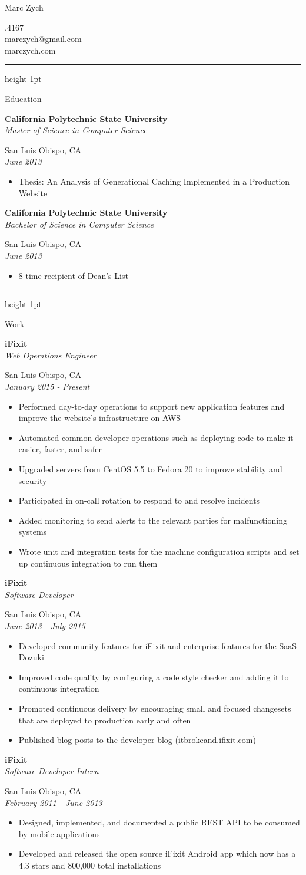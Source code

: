 \documentclass[letterpaper,10pt]{article}
\newcommand{\resauthor}[4]{
   \begin{minipage}[c]{.4\textwidth}
      \raggedright
      {\Huge #1}
   \end{minipage}
   \hfill
   \begin{minipage}[c]{.4\textwidth}
      \raggedleft
      #2\\
      #3\\
      #4
   \end{minipage}
}
\newcommand{\ressectiondivider}{
   \textcolor{black}{\hrule height 1pt}
}
\newcommand{\resitem}[1]{\item #1 \vspace{-2pt}}
\newcommand{\ressubheading}[4]{
   \begin{minipage}[t]{10cm}
      \flushleft
      \textbf{#1}\\
      \textit{#3}\\
   \end{minipage}
   \hfill
   \begin{minipage}[t]{5cm}
      \flushright
      #2\\
      \textit{#4}\\
   \end{minipage}
}
\newenvironment{ressection}[1]{
   \vspace{12pt}
   \ressectiondivider
   \vspace{5pt}
   \begin{minipage}[t]{2.5cm}
      \flushleft
      {\Large #1}
   \end{minipage}
   \hfill
   \begin{minipage}[t]{16cm}
      \flushleft
}{
   \end{minipage}
}
\begin{document}
\resauthor{Marc Zych}{805.217.4167}{marczych@gmail.com}{marczych.com}

\begin{ressection}{Education}
   \ressubheading{California Polytechnic State University}{San Luis Obispo, CA}{Master of Science in Computer Science}{June 2013}
   \begin{itemize}
      \resitem{Thesis: An Analysis of Generational Caching Implemented in a Production Website}
   \end{itemize}
   \ressubheading{California Polytechnic State University}{San Luis Obispo, CA}{Bachelor of Science in Computer Science}{June 2013}
   \begin{itemize}
      \resitem{8 time recipient of Dean's List}
   \end{itemize}
\end{ressection}

\begin{ressection}{Work}
   \ressubheading{iFixit}{San Luis Obispo, CA}{Web Operations Engineer}{January 2015 - Present}
   \begin{itemize}
      \resitem{Performed day-to-day operations to support new application features and improve the website's infrastructure on AWS}
      \resitem{Automated common developer operations such as deploying code to make it easier, faster, and safer}
      \resitem{Upgraded servers from CentOS 5.5 to Fedora 20 to improve stability and security}
      \resitem{Participated in on-call rotation to respond to and resolve incidents}
      \resitem{Added monitoring to send alerts to the relevant parties for malfunctioning systems}
      \resitem{Wrote unit and integration tests for the machine configuration scripts and set up continuous integration to run them}
   \end{itemize}
   \ressubheading{iFixit}{San Luis Obispo, CA}{Software Developer}{June 2013 - July 2015}
   \begin{itemize}
      \resitem{Developed community features for iFixit and enterprise features for the SaaS Dozuki}
      \resitem{Improved code quality by configuring a code style checker and adding it to continuous integration}
      \resitem{Promoted continuous delivery by encouraging small and focused changesets that are deployed to production early and often}
      \resitem{Published blog posts to the developer blog (itbrokeand.ifixit.com)}
   \end{itemize}
   \ressubheading{iFixit}{San Luis Obispo, CA}{Software Developer Intern}{February 2011 - June 2013}
   \begin{itemize}
      \resitem{Designed, implemented, and documented a public REST API to be consumed by mobile applications}
      \resitem{Developed and released the open source iFixit Android app which now has a 4.3 stars and 800,000 total installations}
   \end{itemize}
\end{ressection}
\end{document}
